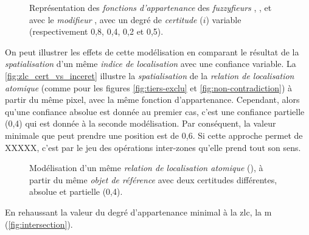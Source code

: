 \begin{figure}
  \centering  \subfloat[\label{fig:fnc_app_inc}]{}\hfill
  \subfloat[\label{fig:fnc_app_inc_2}]{}

  \subfloat[\label{fig:fnc_app_inc_3}]{}\hfill
  \subfloat[\label{fig:fnc_app_inc_4}]{}
  \caption[Représentation des \emph{fonctions d'appartenance} de
  différents \emph{fuzzyfieurs} avec une
  \emph{incertitude}]{Représentation des \emph{fonctions
      d'appartenance} des \emph{fuzzyfieurs}
    \protect{} \protect{},
    \protect{} \protect{},
    \protect{} \protect{}
    et \protect{} avec le \emph{modifieur}
    \protect{} \protect{}, avec
    un degré de \emph{certitude} (\(i\)) variable (respectivement
    0,8, 0,4, 0,2 et 0,5).}
  \label{fig:fnc_incert}
\end{figure}

On peut illustrer les effets de cette modélisation en comparant le
résultat de la \emph{spatialisation} d'un même \emph{indice de
  localisation} avec une confiance variable. La
\autoref{fig:zlc_cert_vs_inceret} illustre la \emph{spatialisation} de
la \emph{relation de localisation atomique} 
(comme pour les figures \ref{fig:tiers-exclu} et
\ref{fig:non-contradiction}) à partir du même pixel, avec la même
fonction d'appartenance. Cependant, alors qu'une confiance absolue est
donnée au premier cas, c'est une confiance partielle (0,4) qui est
donnée à la seconde modélisation. Par conséquent, la valeur minimale
que peut prendre une position est de 0,6. Si cette approche permet de
XXXXX, c'est par le jeu des opérations inter-zones qu'elle prend tout
son sens.

\begin{figure}
  \centering
  \subfloat[]{}\hspace{2cm}
  \subfloat[]{}
  \caption{Modélisation d'un même \emph{relation de localisation
      atomique} (\protect{}), à partir du même
    \emph{objet de référence} avec deux certitudes différentes,
    absolue et partielle (0,4).}
  \label{fig:zlc_cert_vs_inceret}
\end{figure}

En rehaussant la valeur du degré d'appartenance minimal à la \ac{zlc},
la m (\autoref{fig:intersection}).

